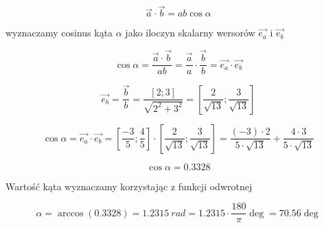 \[ \Vec{a} \cdot \Vec{b} = a b \cos\alpha \]

wyznaczamy cosinus kąta $\alpha$ jako iloczyn skalarny wersorów $\Vec{e_a}$ i $\Vec{e_b}$

\begin{equation}
    \cos\alpha = \frac{\Vec{a}\cdot\Vec{b}}{ab} = \frac{\Vec{a}}{a}\cdot\frac{\Vec{b}}{b} = \Vec{e_a}\cdot\Vec{e_b}
\end{equation}

\[ \Vec{e_b} = \frac{\Vec{b}}{b} = \frac{[2;3]}{\sqrt{2^2+3^2}} = \left[ \frac{2}{\sqrt{13}} ; \frac{3}{\sqrt{13}} \right] \]

\[ \cos\alpha = \Vec{e_a}\cdot\Vec{e_b} = \left[ \frac{-3}{5} ; \frac{4}{5} \right] \cdot \left[ \frac{2}{\sqrt{13}} ; \frac{3}{\sqrt{13}} \right] = \frac{(-3)\cdot 2}{5\cdot\sqrt{13}} + \frac{4 \cdot 3}{5 \cdot \sqrt{13}} \]

\[ \cos\alpha = 0.3328 \]

Wartość kąta wyznaczamy korzystając z funkcji odwrotnej

\[ \alpha = \arccos(0.3328) = \SI{1.2315}{rad} = 1.2315 \cdot \frac{180}{\pi} \deg = 70.56 \deg \]